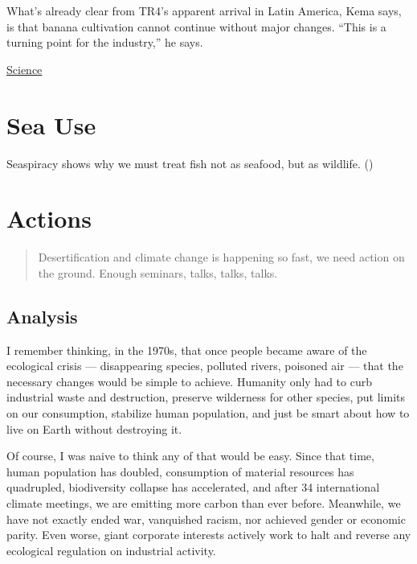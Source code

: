 \documentclass[
]{book}
\begin{document}
What's already clear from TR4's apparent arrival in Latin America, Kema says, is that banana cultivation cannot continue without major changes. ``This is a turning point for the industry,'' he says.

\href{https://www.sciencemag.org/news/2019/07/devastating-banana-disease-may-have-reached-latin-america-could-drive-global-prices}{Science}

\hypertarget{sea-use}{%
\chapter{Sea Use}\label{sea-use}}

Seaspiracy shows why we must treat fish not as seafood, but as wildlife.
(\citet{GeorgeMonbiot})

\hypertarget{actions}{%
\chapter{Actions}\label{actions}}

\begin{quote}
Desertification and climate change is happening so fast,
we need action on the ground.
Enough seminars, talks, talks, talks.
\end{quote}

\hypertarget{analysis}{%
\section{Analysis}\label{analysis}}

I remember thinking, in the 1970s, that once people became aware of the ecological crisis --- disappearing species, polluted rivers, poisoned air --- that the necessary changes would be simple to achieve. Humanity only had to curb industrial waste and destruction, preserve wilderness for other species, put limits on our consumption, stabilize human population, and just be smart about how to live on Earth without destroying it.

Of course, I was naive to think any of that would be easy. Since that time, human population has doubled, consumption of material resources has quadrupled, biodiversity collapse has accelerated, and after 34 international climate meetings, we are emitting more carbon than ever before. Meanwhile, we have not exactly ended war, vanquished racism, nor achieved gender or economic parity. Even worse, giant corporate interests actively work to halt and reverse any ecological regulation on industrial activity.
\end{document}
